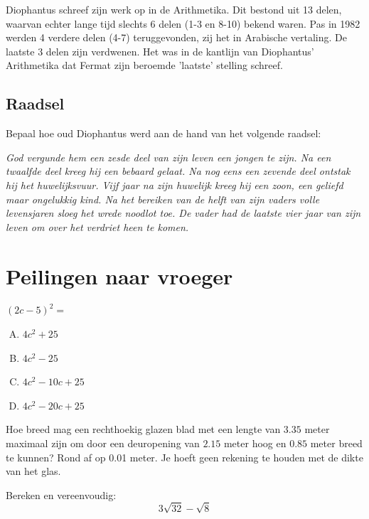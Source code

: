 \documentclass[12pt]{article}
\begin{document}
Diophantus schreef zijn werk op in de Arithmetika. Dit bestond uit 13 delen, waarvan echter lange tijd slechts 6 delen (1-3 en 8-10) bekend waren. Pas in 1982 werden 4 verdere delen (4-7) teruggevonden, zij het in Arabische vertaling. De laatste 3 delen zijn verdwenen. Het was in de kantlijn van Diophantus' Arithmetika dat Fermat zijn beroemde 'laatste' stelling schreef.

\subsection*{Raadsel}

Bepaal hoe oud Diophantus werd aan de hand van het volgende raadsel:

{\em God vergunde hem een zesde deel van zijn leven een jongen te zijn. Na een twaalfde deel kreeg hij een bebaard gelaat. Na nog eens een zevende deel ontstak hij het huwelijksvuur. Vijf jaar na zijn huwelijk kreeg hij een zoon, een geliefd maar ongelukkig kind. Na het bereiken van de helft van zijn vaders volle levensjaren sloeg het wrede noodlot toe. De vader had de laatste vier jaar van zijn leven om over het verdriet heen te komen. }

\section*{Peilingen naar vroeger}

\begin{oefening}
  $(2c-5)^2=$
  \begin{center}
    \begin{enumerate}[(A)]
    \itemsep.5em
    \item $4c^2+25$
    \item $4c^2-25$
    \item $4c^2-10c+25$
    \item $4c^2-20c+25$
    \end{enumerate}
  \end{center}
\end{oefening}

\begin{oefening}
  Hoe breed mag een rechthoekig glazen blad met een lengte van $3.35$ meter maximaal zijn om door een deuropening van $2.15$ meter hoog en $0.85$ meter breed te kunnen? Rond af op 0.01 meter. Je hoeft geen rekening te houden met de dikte van het glas.
\end{oefening}

\begin{oefening}
  Bereken en vereenvoudig: $$3\sqrt{32}-\sqrt{8}$$
\end{oefening}
\end{document}

